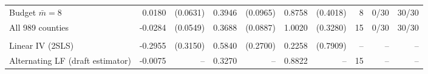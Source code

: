 \begin{tabular}{lrrrrrrrrr}
Budget $\bar m = 8$ & 0.0180 & (0.0631) & 0.3946 & (0.0965) & 0.8758 & (0.4018) & 8 & 0/30 & 30/30 \\
All 989 counties & -0.0284 & (0.0549) & 0.3688 & (0.0887) & 1.0020 & (0.3280) & 15 & 0/30 & 30/30 \\
\addlinespace
\multicolumn{10}{l}{\textit{Comparison estimators}} \\
Linear IV (2SLS) & -0.2955 & (0.3150) & 0.5840 & (0.2700) & 0.2258 & (0.7909) & -- & -- & -- \\
Alternating LF (draft estimator) & -0.0075 & -- & 0.3270 & -- & 0.8822 & -- & 15 & -- & -- \\
\bottomrule
\end{tabular}
